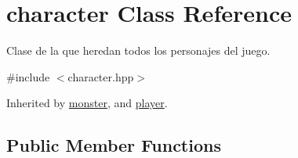 \hypertarget{classcharacter}{\section{character Class Reference}
\label{classcharacter}
}


Clase de la que heredan todos los personajes del juego.  




{\ttfamily \#include $<$character.\-hpp$>$}



Inherited by \hyperlink{classmonster}{monster}, and \hyperlink{classplayer}{player}.

\subsection*{Public Member Functions}
